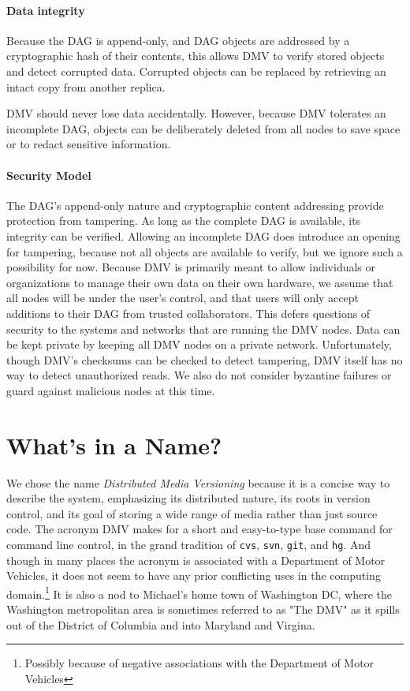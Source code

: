 \paragraph{Data integrity}

Because the \gls{DAG} is append-only, and \gls{DAG} objects are addressed by a
cryptographic hash of their contents, this allows \gls{DMV} to verify stored
objects and detect corrupted data. Corrupted objects can be replaced by
retrieving an intact copy from another replica.

\gls{DMV} should never lose data accidentally. However, because \gls{DMV}
tolerates an incomplete \gls{DAG}, objects can be deliberately deleted from all
nodes to save space or to redact sensitive information.


\paragraph{Security Model}

The \gls{DAG}'s append-only nature and cryptographic content addressing provide
protection from tampering. As long as the complete \gls{DAG} is available, its
integrity can be verified. Allowing an incomplete \gls{DAG} does introduce an
opening for tampering, because not all objects are available to verify, but we
ignore such a possibility for now. Because \gls{DMV} is primarily meant to allow
individuals or organizations to manage their own data on their own hardware, we
assume that all nodes will be under the user's control, and that users will only
accept additions to their \gls{DAG} from trusted collaborators. This defers
questions of security to the systems and networks that are running the \gls{DMV}
nodes. Data can be kept private by keeping all \gls{DMV} nodes on a private
network. Unfortunately, though \gls{DMV}'s checksums can be checked to detect
tampering, \gls{DMV} itself has no way to detect unauthorized reads. We also do
not consider byzantine failures or guard against malicious nodes at this time.

%


\section{What's in a Name?}

We chose the name \emph{Distributed Media Versioning} because it is a concise
way to describe the system, emphasizing its distributed nature, its roots in
version control, and its goal of storing a wide range of media rather than just
source code. The acronym \gls{DMV} makes for a short and easy-to-type base
command for command line control, in the grand tradition of \lstinline{cvs},
\lstinline{svn}, \lstinline{git}, and \lstinline{hg}. And though in many places
the acronym is associated with a Department of Motor Vehicles, it does not seem
to have any prior conflicting uses in the computing domain.\footnote{Possibly
because of negative associations with the Department of Motor Vehicles} It is
also a nod to Michael's home town of Washington DC, where the Washington
metropolitan area is sometimes referred to as "The DMV" as it spills out of the
District of Columbia and into Maryland and Virgina.
